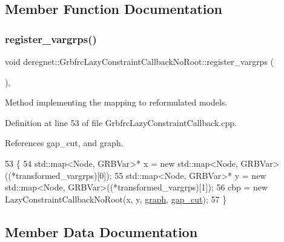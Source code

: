 \subsection{Member Function Documentation}
\mbox{\label{classderegnet_1_1GrbfrcLazyConstraintCallbackNoRoot_a4e6595d467c68a9b94f393991df04bbd}} 
\subsubsection{\texorpdfstring{register\+\_\+vargrps()}{register\_vargrps()}}
{\footnotesize\ttfamily void deregnet\+::\+Grbfrc\+Lazy\+Constraint\+Callback\+No\+Root\+::register\+\_\+vargrps (\begin{DoxyParamCaption}{ }\end{DoxyParamCaption})\hspace{0.3cm}{\ttfamily [override]}, {\ttfamily [virtual]}}



Method implementing the mapping to reformulated models. 



Definition at line 53 of file Grbfrc\+Lazy\+Constraint\+Callback.\+cpp.



References gap\+\_\+cut, and graph.


\begin{DoxyCode}
53                                                           \{
54     std::map<Node, GRBVar>* x = \textcolor{keyword}{new} std::map<Node, GRBVar>((*transformed\_vargrps)[0]);
55     std::map<Node, GRBVar>* y = \textcolor{keyword}{new} std::map<Node, GRBVar>((*transformed\_vargrps)[1]);
56     cbp = \textcolor{keyword}{new} LazyConstraintCallbackNoRoot(x, y, \hyperlink{classderegnet_1_1GrbfrcLazyConstraintCallbackNoRoot_a0c5b7bfa966879cc74fea0ea1c5c864c}{graph}, \hyperlink{classderegnet_1_1GrbfrcLazyConstraintCallbackNoRoot_ac8425029e6bb6929bc08c261f203cccf}{gap\_cut});
57 \}
\end{DoxyCode}


\subsection{Member Data Documentation}
\mbox{\label{classderegnet_1_1GrbfrcLazyConstraintCallbackNoRoot_ac8425029e6bb6929bc08c261f203cccf}} 
